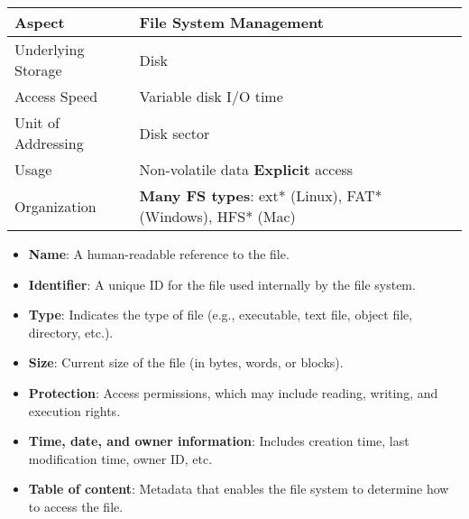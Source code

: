 \documentclass[8pt,twocolumn]{article}
\begin{document}
    \begin{table}[h!]
        \centering
        \renewcommand{\arraystretch}{0.6}
        \begin{tabular}{|l|p{6cm}|}
        \hline
        \textbf{Aspect} & \textbf{File System Management} \\
        \hline
        Underlying Storage & Disk \\
        \hline
        Access Speed & Variable disk I/O time \\
        \hline
        Unit of Addressing & Disk sector \\
        \hline
        Usage & Non-volatile data \newline \textbf{Explicit} access \\
        \hline
        Organization & \textbf{Many FS types}: ext* (Linux), FAT* (Windows), HFS* (Mac) \\
        \hline
        \end{tabular}
        \end{table}
        \vspace{-1.5em} %
\begin{itemize}
    \setlength{\itemsep}{0pt} %
    \setlength{\parskip}{0pt}
  \item \textbf{Name}: A human-readable reference to the file.
  \item \textbf{Identifier}: A unique ID for the file used internally by the file system.
  \item \textbf{Type}: Indicates the type of file (e.g., executable, text file, object file, directory, etc.).
  \item \textbf{Size}: Current size of the file (in bytes, words, or blocks).
  \item \textbf{Protection}: Access permissions, which may include reading, writing, and execution rights.
  \item \textbf{Time, date, and owner information}: Includes creation time, last modification time, owner ID, etc.
  \item \textbf{Table of content}: Metadata that enables the file system to determine how to access the file.
\end{itemize}
\end{document}
